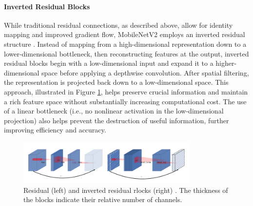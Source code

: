 
\paragraph{Inverted Residual Blocks}
While traditional residual connections, as described above, allow for identity mapping and improved gradient flow, MobileNetV2 employs an inverted residual structure \cite{sandler2018mobilenetv2}. Instead of mapping from a high-dimensional representation down to a lower-dimensional bottleneck, then reconstructing features at the output, inverted residual blocks begin with a low-dimensional input and expand it to a higher-dimensional space before applying a depthwise convolution. After spatial filtering, the representation is projected back down to a low-dimensional space. This approach, illustrated in Figure \ref{fig:residual}, helps preserve crucial information and maintain a rich feature space without substantially increasing computational cost. The use of a linear bottleneck (i.e., no nonlinear activation in the low-dimensional projection) also helps prevent the destruction of useful information, further improving efficiency and accuracy.  

\begin{figure}[ht]
    \centering
    \includegraphics[width=0.8\textwidth]{Images/inverted_residual.png} 
    \caption{Residual (left) and inverted residual rlocks (right) \cite{sandler2018mobilenetv2}. The thickness of the blocks indicate their relative number of channels.}
    \label{fig:residual}
\end{figure}


